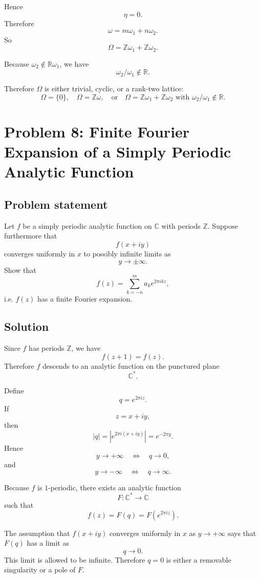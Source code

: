 \documentclass[12pt,a4paper]{article}
\theoremstyle{notespace}
\begin{document}
Hence
\[
\eta=0.
\]
Therefore
\[
\omega=m\omega_1+n\omega_2.
\]
So
\[
\Omega=\mathbb Z\omega_1+\mathbb Z\omega_2.
\]

Because \(\omega_2\notin\mathbb R\omega_1\), we have
\[
\omega_2/\omega_1\notin\mathbb R.
\]

Therefore \(\Omega\) is either trivial, cyclic, or a rank-two lattice:
\[
\boxed{
	\Omega=\{0\},
	\quad
	\Omega=\mathbb Z\omega,
	\quad\text{or}\quad
	\Omega=\mathbb Z\omega_1+\mathbb Z\omega_2
	\text{ with }\omega_2/\omega_1\notin\mathbb R.
}
\]
	
\section{Problem 8: Finite Fourier Expansion of a Simply Periodic Analytic Function}

\subsection*{Problem statement}

Let \(f\) be a simply periodic analytic function on \(\mathbb C\) with periods
\(\mathbb Z\). Suppose furthermore that
\[
f(x+iy)
\]
converges uniformly in \(x\) to possibly infinite limits as
\[
y\to\pm\infty.
\]
Show that
\[
f(z)=\sum_{k=-n}^{m} a_k e^{2\pi i kz},
\]
i.e. \(f(z)\) has a finite Fourier expansion.

\subsection*{Solution}

Since \(f\) has periods \(\mathbb Z\), we have
\[
f(z+1)=f(z).
\]
Therefore \(f\) descends to an analytic function on the punctured plane
\[
\mathbb C^*.
\]

Define
\[
q=e^{2\pi i z}.
\]
If
\[
z=x+iy,
\]
then
\[
|q|=|e^{2\pi i(x+iy)}|=e^{-2\pi y}.
\]
Hence
\[
y\to+\infty
\quad\Longleftrightarrow\quad
q\to 0,
\]
and
\[
y\to-\infty
\quad\Longleftrightarrow\quad
q\to\infty.
\]

Because \(f\) is \(1\)-periodic, there exists an analytic function
\[
F:\mathbb C^*\to\mathbb C
\]
such that
\[
f(z)=F(q)=F(e^{2\pi i z}).
\]

The assumption that \(f(x+iy)\) converges uniformly in \(x\) as
\(y\to+\infty\) says that \(F(q)\) has a limit as
\[
q\to 0.
\]
This limit is allowed to be infinite. Therefore \(q=0\) is either a removable
singularity or a pole of \(F\).
\end{document}
